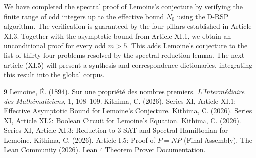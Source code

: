 \documentclass[11pt,a4paper]{article}
\begin{document}
We have completed the spectral proof of Lemoine's conjecture by verifying the finite range of odd integers up to the effective bound \(N_0\) using the D‑RSP algorithm. The verification is guaranteed by the four pillars established in Article XI.3. Together with the asymptotic bound from Article XI.1, we obtain an unconditional proof for every odd \(m>5\). This adds Lemoine's conjecture to the list of thirty‑four problems resolved by the spectral reduction lemma. The next article (XI.5) will present a synthesis and correspondence dictionaries, integrating this result into the global corpus.


\begin{thebibliography}{9}
  Lemoine, É. (1894). Sur une propriété des nombres premiers. \emph{L'Intermédiaire des Mathématiciens}, 1, 108–109.
  Kithima, C. (2026). Series XI, Article XI.1: Effective Asymptotic Bound for Lemoine's Conjecture.
  Kithima, C. (2026). Series XI, Article XI.2: Boolean Circuit for Lemoine's Equation.
  Kithima, C. (2026). Series XI, Article XI.3: Reduction to 3‑SAT and Spectral Hamiltonian for Lemoine.
  Kithima, C. (2026). Article I.5: Proof of \(P = NP\) (Final Assembly).
  The Lean Community (2026). Lean 4 Theorem Prover Documentation.
\end{thebibliography}
\end{document}
